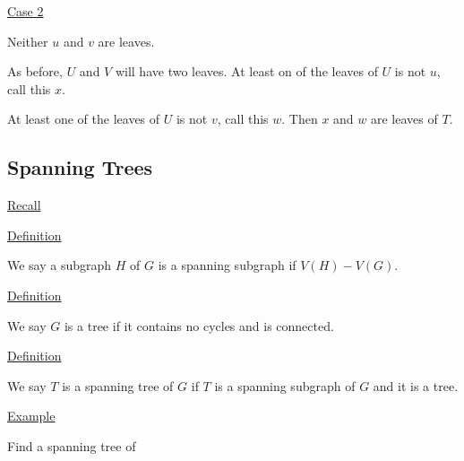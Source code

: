 \documentclass{article}
\begin{document}
\underline{Case 2}

Neither $u$ and $v$ are leaves. 

As before, $U$ and $V$ will have two leaves. At least on of the leaves of $U$ is not $u$, call this $x$.

At least one of the leaves of $U$ is not $v$, call this $w$. Then $x$ and $w$ are leaves of $T$. 

\begin{center}
\end{center}

\subsection{Spanning Trees}

\underline{Recall}

\underline{Definition}

We say a subgraph $H$ of $G$ is a spanning subgraph if $V(H) - V(G)$.

\underline{Definition}

We say $G$ is a tree if it contains no cycles and is connected. 

\underline{Definition}

We say $T$ is a spanning tree of $G$ if $T$ is a spanning subgraph of $G$ and it is a tree. 

\underline{Example}

Find a spanning tree of
\end{document}
